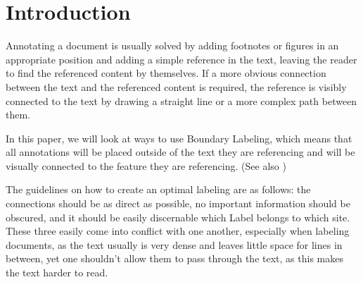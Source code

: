 \documentclass[11pt,a4paper]{vutinfth}
\begin{document}
\frontmatter
\addstatementpage






\tableofcontents

\mainmatter



\section{Introduction}%
Annotating a document is usually solved by adding footnotes or figures in an appropriate position and adding a simple reference in the text, leaving the reader to find the referenced content by themselves. If a more obvious connection between the text and the referenced content is required, the reference is visibly connected to the text by drawing a straight line or a more complex path between them.

In this paper, we will look at ways to use Boundary Labeling, which means that all annotations will be placed outside of the text they are referencing and will be visually connected to the feature they are referencing. (See also \cite{Bekos2007}) 

The guidelines on how to create an optimal labeling are as follows: the connections should be as direct as possible, no important information should be obscured, and it should be easily discernable which Label belongs to which site. These three easily come into conflict with one another, especially when labeling documents, as the text usually is very dense and leaves little space for lines in between, yet one shouldn't allow them to pass through the text, as this makes the text harder to read. 
\end{document}

